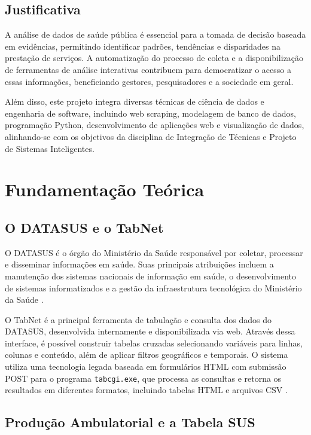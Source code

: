 \documentclass[
    12pt,
    oneside,
    a4paper,
    chapter=TITLE,
    section=TITLE
]{abntex2}
\begin{document}
\section{Justificativa}

A análise de dados de saúde pública é essencial para a tomada de decisão baseada em evidências, permitindo identificar padrões, tendências e disparidades na prestação de serviços. A automatização do processo de coleta e a disponibilização de ferramentas de análise interativas contribuem para democratizar o acesso a essas informações, beneficiando gestores, pesquisadores e a sociedade em geral.

Além disso, este projeto integra diversas técnicas de ciência de dados e engenharia de software, incluindo web scraping, modelagem de banco de dados, programação Python, desenvolvimento de aplicações web e visualização de dados, alinhando-se com os objetivos da disciplina de Integração de Técnicas e Projeto de Sistemas Inteligentes.


\chapter{Fundamentação Teórica}

\section{O DATASUS e o TabNet}

O DATASUS é o órgão do Ministério da Saúde responsável por coletar, processar e disseminar informações em saúde. Suas principais atribuições incluem a manutenção dos sistemas nacionais de informação em saúde, o desenvolvimento de sistemas informatizados e a gestão da infraestrutura tecnológica do Ministério da Saúde \cite{datasus2026}.

O TabNet é a principal ferramenta de tabulação e consulta dos dados do DATASUS, desenvolvida internamente e disponibilizada via web. Através dessa interface, é possível construir tabelas cruzadas selecionando variáveis para linhas, colunas e conteúdo, além de aplicar filtros geográficos e temporais. O sistema utiliza uma tecnologia legada baseada em formulários HTML com submissão POST para o programa \texttt{tabcgi.exe}, que processa as consultas e retorna os resultados em diferentes formatos, incluindo tabelas HTML e arquivos CSV \cite{tabnet2026}.

\section{Produção Ambulatorial e a Tabela SUS}
\end{document}
